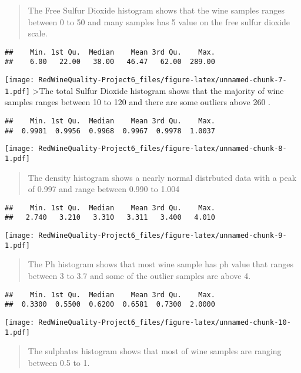 \documentclass[]{article}
\begin{document}
\begin{quote}
The Free Sulfur Dioxide histogram shows that the wine samples ranges
between 0 to 50 and many samples has 5 value on the free sulfur dioxide
scale.
\end{quote}

\begin{verbatim}
##    Min. 1st Qu.  Median    Mean 3rd Qu.    Max. 
##    6.00   22.00   38.00   46.47   62.00  289.00
\end{verbatim}

\texttt{[image: RedWineQuality-Project6\_files/figure-latex/unnamed-chunk-7-1.pdf]}
\textgreater The total Sulfur Dioxide histogram shows that the majority
of wine samples ranges between 10 to 120 and there are some outliers
above 260 .

\begin{verbatim}
##    Min. 1st Qu.  Median    Mean 3rd Qu.    Max. 
##  0.9901  0.9956  0.9968  0.9967  0.9978  1.0037
\end{verbatim}

\texttt{[image: RedWineQuality-Project6\_files/figure-latex/unnamed-chunk-8-1.pdf]}

\begin{quote}
The density histogram shows a nearly normal distrbuted data with a peak
of 0.997 and range between 0.990 to 1.004
\end{quote}

\begin{verbatim}
##    Min. 1st Qu.  Median    Mean 3rd Qu.    Max. 
##   2.740   3.210   3.310   3.311   3.400   4.010
\end{verbatim}

\texttt{[image: RedWineQuality-Project6\_files/figure-latex/unnamed-chunk-9-1.pdf]}

\begin{quote}
The Ph histogram shows that most wine sample has ph value that ranges
between 3 to 3.7 and some of the outlier samples are above 4.
\end{quote}

\begin{verbatim}
##    Min. 1st Qu.  Median    Mean 3rd Qu.    Max. 
##  0.3300  0.5500  0.6200  0.6581  0.7300  2.0000
\end{verbatim}

\texttt{[image: RedWineQuality-Project6\_files/figure-latex/unnamed-chunk-10-1.pdf]}

\begin{quote}
The sulphates histogram shows that most of wine samples are ranging
between 0.5 to 1.
\end{quote}
\end{document}
